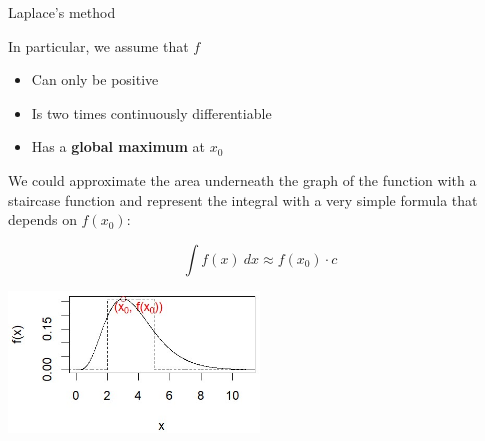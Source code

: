 \documentclass[11pt,compress,t,notes=noshow, xcolor=table]{beamer}
\begin{document}
\begin{vbframe}{Laplace's method}









\framebreak
In particular, we assume that $f$

\begin{itemize}
\item Can only be positive
\item Is two times continuously differentiable
\item Has a \textbf{global maximum} at $x_0$
\end{itemize}


\vspace*{0.1cm}
We could approximate the area underneath the graph of the function with a staircase function and represent the integral with a very simple formula that depends on $f(x_0)$:
\vspace*{-0.1cm}
\begin{footnotesize}
$$
\int f(x)~dx \approx f(x_0) \cdot c
$$

\begin{center}
\includegraphics[width =0.5\textwidth]{figure_man/normaldist2.jpg}
\end{center}


\end{footnotesize}


\end{vbframe}
\end{document}
